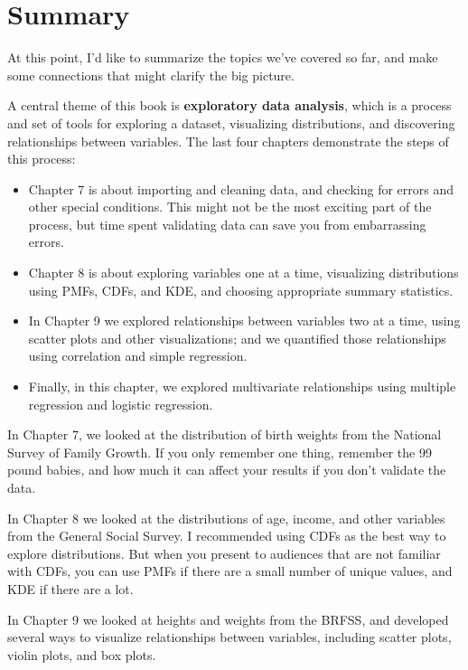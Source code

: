 \hypertarget{summary}{%
\section{Summary}\label{summary}}

At this point, I'd like to summarize the topics we've covered so far,
and make some connections that might clarify the big picture.

A central theme of this book is \textbf{exploratory data analysis},
which is a process and set of tools for exploring a dataset, visualizing
distributions, and discovering relationships between variables. The last
four chapters demonstrate the steps of this process:

\begin{itemize}
\item
  Chapter 7 is about importing and cleaning data, and checking for
  errors and other special conditions. This might not be the most
  exciting part of the process, but time spent validating data can save
  you from embarrassing errors.
\item
  Chapter 8 is about exploring variables one at a time, visualizing
  distributions using PMFs, CDFs, and KDE, and choosing appropriate
  summary statistics.
\item
  In Chapter 9 we explored relationships between variables two at a
  time, using scatter plots and other visualizations; and we quantified
  those relationships using correlation and simple regression.
\item
  Finally, in this chapter, we explored multivariate relationships using
  multiple regression and logistic regression.
\end{itemize}

In Chapter 7, we looked at the distribution of birth weights from the
National Survey of Family Growth. If you only remember one thing,
remember the 99 pound babies, and how much it can affect your results if
you don't validate the data.

In Chapter 8 we looked at the distributions of age, income, and other
variables from the General Social Survey. I recommended using CDFs as
the best way to explore distributions. But when you present to audiences
that are not familiar with CDFs, you can use PMFs if there are a small
number of unique values, and KDE if there are a lot.

In Chapter 9 we looked at heights and weights from the BRFSS, and
developed several ways to visualize relationships between variables,
including scatter plots, violin plots, and box plots.

